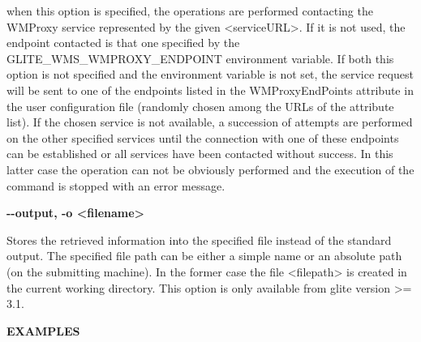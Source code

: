 when this option is specified, the operations are performed contacting the WMProxy 
service represented by the given <serviceURL>. If it is not used, the endpoint contacted is that one 
specified by the GLITE\_WMS\_WMPROXY\_ENDPOINT environment variable. 
If both this option is not specified 
and the environment variable is not set, the service request will be sent to one of the endpoints listed 
in the WMProxyEndPoints attribute in the user configuration file (randomly chosen among the URLs of the 
attribute list). If the chosen service is not available, a succession of attempts are performed on the 
other specified services until the connection with one of these endpoints can be established or all 
services have been contacted without success. In this latter case the operation can not be obviously 
performed and the execution of the command is stopped with an error message.





\textbf{-{}-output, -o <filename>}

Stores the retrieved information into the specified file instead of the standard output. 
The specified file path can be either a simple name or an absolute path (on the submitting machine). 
In the former case the file <filepath> is created in the current working directory.
This option is only available from glite version >= 3.1.





\medskip
\textbf{EXAMPLES}
\smallskip


